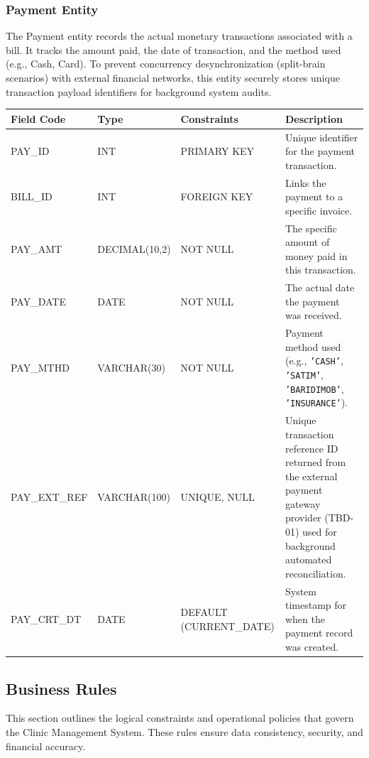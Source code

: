 \subsubsection{Payment Entity}
The Payment entity records the actual monetary transactions associated with a bill. It tracks the amount paid, the date of transaction, and the method used (e.g., Cash, Card). To prevent concurrency desynchronization (split-brain scenarios) with external financial networks, this entity securely stores unique transaction payload identifiers for background system audits.

\begin{table}[H]
	\centering
	\small
	\renewcommand{\arraystretch}{1.4}
	\begin{tabularx}{\textwidth}{l l l X}
		\toprule
		\rowcolor[gray]{0.9} \textbf{Field Code} & \textbf{Type} & \textbf{Constraints} & \textbf{Description} \\
		\midrule
		PAY\_ID & INT & PRIMARY KEY & Unique identifier for the payment transaction. \\
		BILL\_ID & INT & FOREIGN KEY & Links the payment to a specific invoice. \\
		PAY\_AMT & DECIMAL(10,2) & NOT NULL & The specific amount of money paid in this transaction. \\
		PAY\_DATE & DATE & NOT NULL & The actual date the payment was received. \\
		PAY\_MTHD & VARCHAR(30) & NOT NULL & Payment method used (e.g., \texttt{'CASH'}, \texttt{'SATIM'}, \texttt{'BARIDIMOB'}, \texttt{'INSURANCE'}). \\
		PAY\_EXT\_REF & VARCHAR(100) & UNIQUE, NULL & Unique transaction reference ID returned from the external payment gateway provider (TBD-01) used for background automated reconciliation. \\
		PAY\_CRT\_DT & DATE & DEFAULT (CURRENT\_DATE) & System timestamp for when the payment record was created. \\
		\bottomrule
	\end{tabularx}
\end{table}
\subsection{Business Rules}
This section outlines the logical constraints and operational policies that govern the Clinic Management System. These rules ensure data consistency, security, and financial accuracy.

